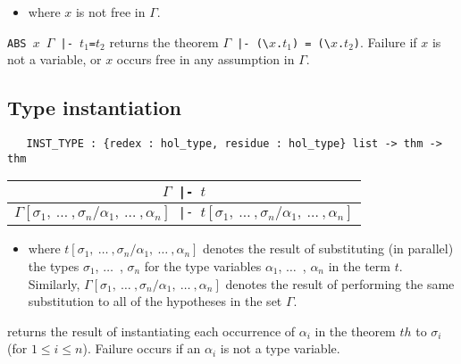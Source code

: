 \begin{itemize}
\item where $x$ is not free in $\Gamma$.
\end{itemize}

\noindent
{\small\verb+ABS +}$x${\small\verb+ +}$\Gamma${\small\verb+ |- +}$t_1${\small\verb+=+}$t_2$ returns the theorem
$\Gamma${\small\verb+ |- (\+}$x${\small\verb+.+}$t_1${\small\verb+) = (\+}$x${\small\verb+.+}$t_2${\small\verb+)+}.
Failure if $x$ is not a variable, or $x$
 occurs free in any assumption in $\Gamma$.


\bigskip

\subsection{Type instantiation}

\begin{holboxed}
\begin{verbatim}
   INST_TYPE : {redex : hol_type, residue : hol_type} list -> thm -> thm
\end{verbatim}
\end{holboxed}

\begin{center}
\begin{tabular}{c}
$\Gamma${\small\verb+ |- +}$t$ \\ \hline
$\Gamma[\sigma_1,\ \ldots\ ,\sigma_n/\alpha_1,\ \ldots\ ,\alpha_n]${\small\verb+ |- +}$t[\sigma_1,\ \ldots\ ,\sigma_n/\alpha_1,\ \ldots\ ,\alpha_n]$
\end{tabular}
\end{center}

\bigskip

\begin{itemize}
\item where $t[\sigma_1,\ \ldots\ ,\sigma_n/\alpha_1,\ \ldots\ ,\alpha_n]$
denotes the result of substituting (in parallel) the types $\sigma_1$,
$\ldots$\ , $\sigma_n$ for the type variables $\alpha_1$, $\ldots$\ ,
$\alpha_n$ in the term $t$.  Similarly, $\Gamma[\sigma_1,\ \ldots\
,\sigma_n/\alpha_1,\ \ldots\ ,\alpha_n]$ denotes the result of
performing the same substitution to all of the hypotheses in the set
$\Gamma$.
\end{itemize}

\noindent
{} returns the result of
instantiating each occurrence of $\alpha_i$ in the theorem $th$ to
$\sigma_i$ (for $1 \leq i \leq n$). Failure occurs if an $\alpha_i$ is
not a type variable.


